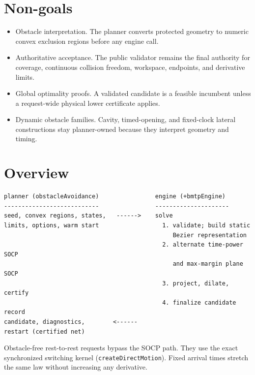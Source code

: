 \documentclass[11pt]{article}
\begin{document}
\section{Non-goals}

\begin{itemize}
    \item Obstacle interpretation. The planner converts protected geometry to numeric
    convex exclusion regions before any engine call.
    \item Authoritative acceptance. The public validator remains the final authority
    for coverage, continuous collision freedom, workspace, endpoints, and
    derivative limits.
    \item Global optimality proofs. A validated candidate is a feasible incumbent
    unless a request-wide physical lower certificate applies.
    \item Dynamic obstacle families. Cavity, timed-opening, and fixed-clock lateral
    constructions stay planner-owned because they interpret geometry and timing.
\end{itemize}

\section{Overview}

\begin{verbatim}
planner (obstacleAvoidance)                engine (+bmtpEngine)
---------------------------                ---------------------
seed, convex regions, states,   ------>    solve
limits, options, warm start                  1. validate; build static
                                                Bezier representation
                                             2. alternate time-power SOCP
                                                and max-margin plane SOCP
                                             3. project, dilate, certify
                                             4. finalize candidate record
candidate, diagnostics,        <------
restart (certified net)
\end{verbatim}

Obstacle-free rest-to-rest requests bypass the SOCP path. They use the exact
synchronized switching kernel (\texttt{createDirectMotion}). Fixed arrival times
stretch the same law without increasing any derivative.
\end{document}
